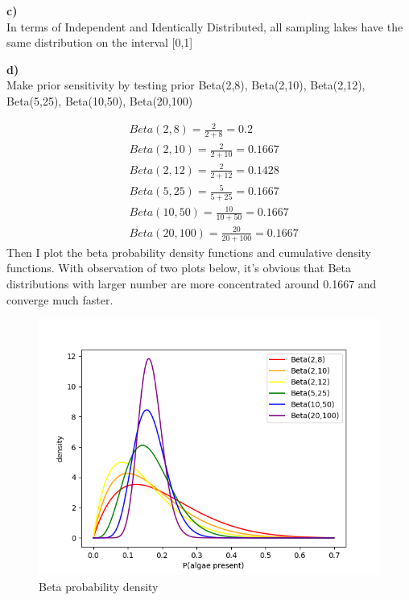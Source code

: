 \documentclass{article}
\begin{document}
\textbf{c)}\\
In terms of Independent and Identically Distributed, all sampling lakes have the same distribution on the interval [0,1]

\textbf{d)}\\

Make prior sensitivity by testing prior Beta(2,8), Beta(2,10), Beta(2,12), Beta(5,25), Beta(10,50), Beta(20,100)

\begin{equation}
\begin{aligned}
&Beta(2,8)=\frac{2}{2+8}=0.2\\
&Beta(2,10)=\frac{2}{2+10}=0.1667\\
&Beta(2,12)=\frac{2}{2+12}=0.1428\\
&Beta(5,25)=\frac{5}{5+25}=0.1667\\
&Beta(10,50)=\frac{10}{10+50}=0.1667\\
&Beta(20,100)=\frac{20}{20+100}=0.1667
\end{aligned}
\end{equation}
Then I plot the beta probability density functions and cumulative density functions. With observation of two plots below, it's obvious that Beta distributions with larger number are more concentrated around 0.1667 and converge much faster.

\begin{figure}[H]
\centering  
\includegraphics[scale=0.6]{plotpdfs.png}
\caption{Beta probability density}
\label{fig: label}
\end{figure}
\end{document}

